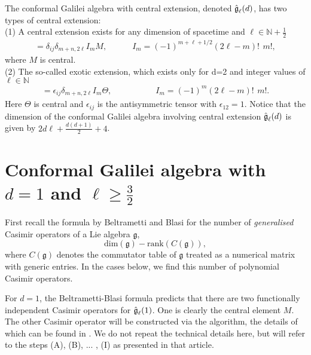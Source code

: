 \documentclass[12pt]{article}
\begin{document}
 The conformal Galilei algebra with central extension, denoted
 $\mathfrak{\Hat{g}}_\ell(d)$,  has two types of central extension\cite{Mar10}:\\
 (1)  A central extension exists for any dimension of spacetime and  $\ell \in  \mathbb{N} +\frac{1}{2}$
\begin{eqnarray}
 [P_{m,i},P_{n,j}]= \delta _{ij}  \delta _{m+n,2\ell} I_{m}  M ,\quad\qquad I_{m}= (-1)^{m+\ell+1/2}  (2\ell -m)! \,\ m!, \label{CG4}
\end{eqnarray}
where $M$ is central. \\
(2) The so-called exotic extension, which exists only for d=2 and integer values of $\ell \in \mathbb{N}$
\begin{eqnarray}
[P_{m,i},P_{n,j}]= \epsilon _{ij} \delta _{m+n,2\ell} I_{m} \Theta,\quad\qquad \,\,\,\,\,\,\,\,\,\,\,\,\ I_{m}= (-1)^m (2\ell -m)! \,\ m!.\label{CG5}
\end{eqnarray}
Here $\Theta$ is central and $\epsilon _{ij}$ is the  antisymmetric tensor with
$\epsilon _{12}=1$. Notice that the dimension  of the conformal Galilei algebra
involving central extension  $\mathfrak{\Hat{g}}_\ell(d)$ is given by $2d\ell+\frac{d(d+1)}{2}+4$. 



\section{Conformal Galilei algebra with $d=1$ and $\ell\geq \frac{3}{2}$}

First recall the formula by Beltrametti and Blasi \cite{BelBla66} for the
number of {\em generalised} Casimir operators of a Lie algebra $\mathfrak{g}$,
\begin{equation}
	\mbox{dim}(\mathfrak{g}) - \mbox{rank}(C(\mathfrak{g})),
	\label{bbformula}
\end{equation}
where $C(\mathfrak{g})$ denotes the commutator table of $\mathfrak{g}$ treated
as a numerical matrix with generic entries. In the cases below, we find
this number of polynomial Casimir operators.

For $d=1$, the Beltrametti-Blasi formula predicts that there are two
functionally independent Casimir operators for $\mathfrak{\Hat{g}}_\ell(1)$.
One is clearly the central element $M$. The other Casimir operator will be
constructed via the algorithm, the details of which
can be found in \cite{Als17}. We do not repeat the technical details here, but
will refer to the steps (A), (B), ... , (I) as presented in that article.
\end{document}

